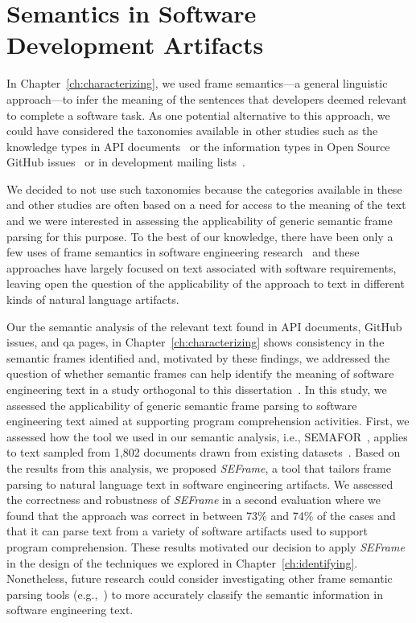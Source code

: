 

\section{Semantics in Software Development Artifacts}
\label{cp7:semantics}



In Chapter~\ref{ch:characterizing}, we used frame semantics---a general
linguistic approach---to infer the meaning of the sentences
that developers deemed relevant to complete a software task.
As one potential alternative to this approach, 
we could have considered the taxonomies available 
in other studies such as the knowledge types in API documents~\cite{Maalej2013}
or the information types in Open Source GitHub issues~\cite{Arya2019} or 
in development mailing lists~\cite{Sorbo2015}.


We decided to not use such taxonomies because the categories available in these and other studies 
are often based
on a need for access to the meaning of
the text
and we were interested in assessing the
applicability of generic semantic frame
parsing for this purpose.
To the best of our knowledge, there have been only a few uses of frame
semantics in software engineering research~\cite{jha2017, kundi2017, alhoshan2019using}
and these approaches
have largely focused on text associated
with software requirements, leaving open the
question of the applicability of the approach to
text in different kinds of natural language artifacts.





Our the semantic analysis of the relevant text 
found in API documents, GitHub issues, and \acs{qa} pages, 
in Chapter~\ref{ch:characterizing} shows consistency 
in the semantic frames identified 
and, motivated by these findings, 
we addressed the question of whether semantic
frames can help identify the meaning of
software engineering text
in a study 
orthogonal to this dissertation~\cite{marques2021}. 
In this study, we assessed the applicability of generic semantic frame
parsing to software engineering text
aimed at supporting program
comprehension activities.
First, we assessed how the tool we used in our semantic analysis, i.e., SEMAFOR~\cite{das2014frame},
 applies to text sampled from 1,802 documents drawn from existing datasets~\cite{Arya2019, Xu2017, Maalej2013, Chaparro2017}. 
Based on the results from this analysis, 
we proposed \textit{SEFrame}, a tool that tailors 
frame parsing to natural language text in software engineering artifacts.
We assessed the correctness and robustness of \textit{SEFrame} in a second evaluation where we found that the approach was 
 correct in between 73\% and 74\% of
the cases and that it can parse text from a variety of software artifacts used to support program
comprehension. These results motivated our decision to apply \textit{SEFrame} 
in the design of the techniques we explored in Chapter~\ref{ch:identifying}.
Nonetheless,  
future research could consider
investigating other 
frame semantic parsing tools (e.g.,~\cite{swayamdipta17, chen2021joint}) to more
accurately classify the semantic information in software engineering
text.
 




